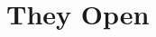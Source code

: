 \documentclass[tom-ari]{subfile}
\begin{document}
	
	\chapter{They Open}
	
	\lipsum[4]
	
\end{document}
